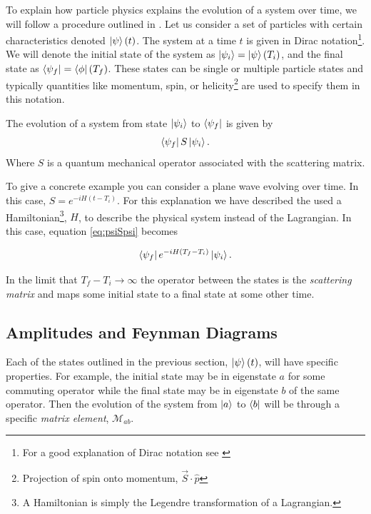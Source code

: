 To explain how particle physics explains the evolution of a system over time, we will follow a procedure outlined in \cite{Maggiore5.1:2005}. Let us consider a set of particles with certain characteristics denoted $\ket{\psi}\left(t\right)$. The system at a time $t$ is given in Dirac notation\footnote{For a good explanation of Dirac notation see \cite{Schwabl:2002}}. We will denote the initial state of the system as $\ket{\psi_{i}} = \ket{\psi}\left(T_{i}\right)$, and the final state as $\bra{\psi_{f}} = \bra{\phi}\left(T_{f}\right)$. These states can be single or multiple particle states and typically quantities like momentum, spin, or helicity\footnote{Projection of spin onto momentum, $\vec{S}\cdot\hat{p}$} are used to specify them in this notation.

The evolution of a system from state $\ket{\psi_{i}}$ to $\bra{\psi_{f}}$ is given by
\begin{equation}
\label{eq:psiSpsi}
\bra{\psi_{f}}S\ket{\psi_{i}}.
\end{equation}
Where $S$ is a quantum mechanical operator associated with the scattering matrix. 

To give a concrete example you can consider a plane wave evolving over time. In this case, $S = e^{-iH\left(t-T_{i}\right)}$. For this explanation we have described the used a Hamiltonian\footnote{A Hamiltonian is simply the Legendre transformation of a Lagrangian.}, $H$, to describe the physical system instead of the Lagrangian. In this case, equation \ref{eq:psiSpsi} becomes

\begin{equation}
\label{eq:WaveSmatrix}
\bra{\psi_{f}}e^{-iH\left(T_{f}-T_{i}\right)}\ket{\psi_{i}}.
\end{equation}

In the limit that $T_{f} - T_{i} \to \infty$ the operator between the states is the \textit{scattering matrix} and maps some initial state to a final state at some other time. 

\subsection{Amplitudes and Feynman Diagrams}
\label{sec:Amplitudes}

Each of the states outlined in the previous section, $\ket{\psi}\left(t\right)$, will have specific properties. For example, the initial state may be in eigenstate $a$ for some commuting operator while the final state may be in eigenstate $b$ of the same operator. Then the evolution of the system from $\ket{a}$ to $\bra{b}$ will be through a specific \textit{matrix element}, $\mathcal{M}_{ab}$.

